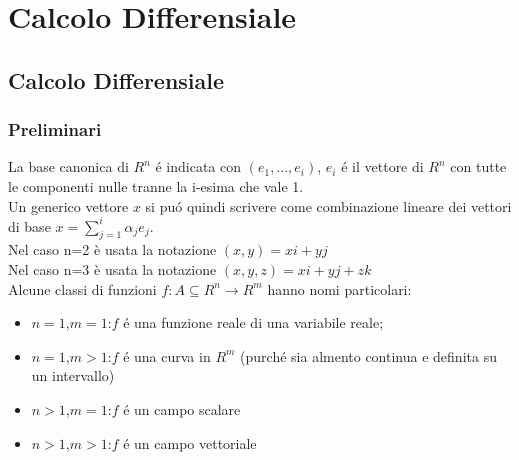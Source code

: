\part{Calcolo Differensiale}

\chapter{Calcolo Differensiale}

\section{Preliminari}
La base canonica di $R^n$ \'e indicata con $(e_1,...,e_i)$, $e_i$ \'e il vettore di $R^n$ con tutte le componenti nulle tranne la i-esima che vale 1.\\
Un generico vettore $x$ si pu\'o quindi scrivere come combinazione lineare dei vettori di base $x=\sum\limits_{j=1}^{i}\alpha_j e_j$.\\
Nel caso n=2 è usata la notazione $(x,y)=xi+yj$\\
Nel caso n=3 è usata la notazione $(x,y,z)=xi+yj+zk$\\
Alcune classi di funzioni $f:A\subseteq{R^n}\rightarrow{R^m}$ hanno nomi particolari:
\begin{itemize}
	\item 
	$n=1$,$m=1$:$f$ \'e una funzione reale di una variabile reale;
	\item 
	$n=1$,$m>1$:$f$ \'e una curva in $R^m$ (purch\'e sia almento continua e definita su un intervallo)
	\item 
	$n>1$,$m=1$:$f$ \'e un campo scalare
	\item
	$n>1$,$m>1$:$f$ \'e un campo vettoriale
\end{itemize}
